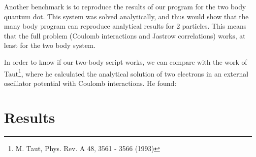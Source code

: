 \documentclass[english, a4paper]{article}
\begin{document}
	Another benchmark is to reproduce the results of our program for the two body quantum dot. This system was solved analytically, and thus would show that the many body program can reproduce analytical results for 2 particles. This means that the full problem (Coulomb interactions and Jastrow correlations) works, at least for the two body system.
	
	In order to know if our two-body script works, we can compare with the work of Taut\footnote{M. Taut, Phys. Rev. A 48, 3561 - 3566 (1993)}, where he calculated the analytical solution of two electrons in an external oscillator potential with Coulomb interactions. He found:
	
	
	
	
	\section{Results}
	
\end{document}
